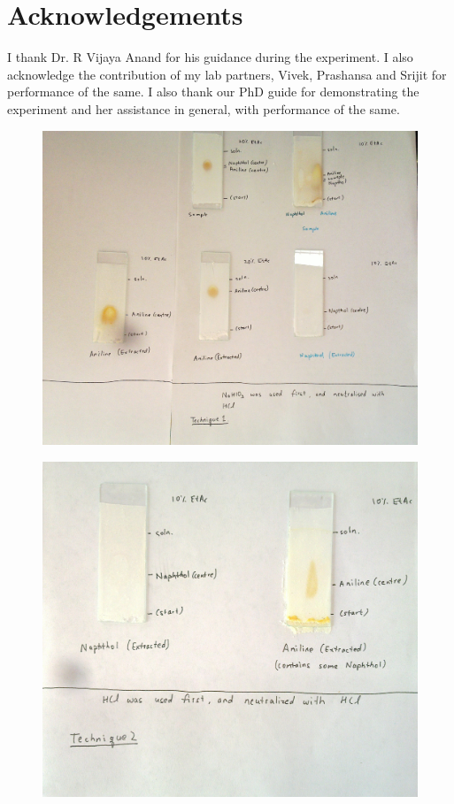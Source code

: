 	
\section{Acknowledgements}
I thank Dr. R Vijaya Anand for his guidance during the experiment. I also acknowledge the contribution of my lab partners, Vivek, Prashansa and Srijit for performance of the same. I also thank our PhD guide for demonstrating the experiment and her assistance in general, with performance of the same.

	\clearpage
	\begin{figure}[bth]
		\begin{center}
			\includegraphics[width=1.5\linewidth]{gfx/e5_1}
		\end{center}
	\caption[TLCs Set 1]{\label{e5_1}}
	\end{figure}

	\begin{figure}[bth]
		\begin{center}
			\includegraphics[width=1.0\linewidth]{gfx/e5_2}
		\end{center}
	\caption[TLCs Set 2]{\label{e5_2}}
	\end{figure}